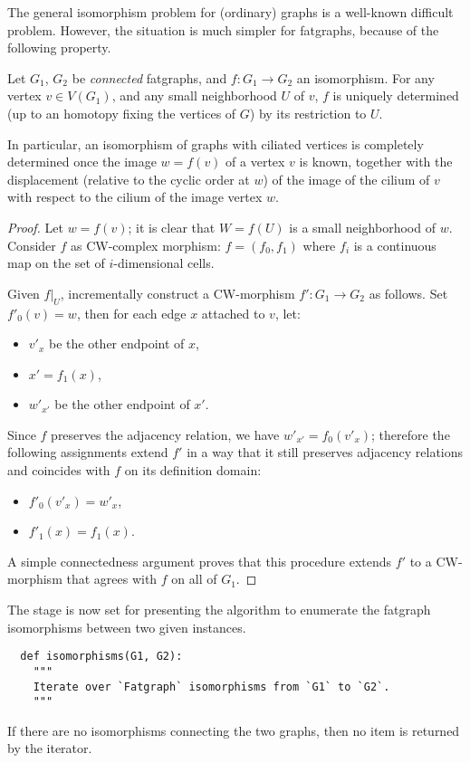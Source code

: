 The general isomorphism problem for (ordinary) graphs is a well-known
difficult problem. However, the situation is much simpler for
fatgraphs, because of the following property.
\begin{lemma}\label{lemma:rigidity}
  Let $G_1$, $G_2$ be \emph{connected} fatgraphs, and $f: G_1 \to G_2$
  an isomorphism.  For any vertex $v \in V(G_1)$, and any small
  neighborhood $U$ of $v$, $f$ is uniquely determined (up to an
  homotopy fixing the vertices of $G$) by its restriction to $U$.
\end{lemma}
In particular, an isomorphism of graphs with ciliated vertices is
completely determined once the image $w=f(v)$ of a vertex $v$ is
known, together with the displacement (relative to the cyclic order at
$w$) of the image of the cilium of $v$ with respect to the cilium of
the image vertex $w$.
\begin{proof}
  Let $w = f(v)$; it is clear that $W = f(U)$ is a small neighborhood
  of $w$.  Consider $f$ as CW-complex morphism: $f = (f_0, f_1)$ where
  $f_i$ is a continuous map on the set of $i$-dimensional cells.

  Given $f|_U$, incrementally construct a CW-morphism $f': G_1 \to
  G_2$ as follows. Set $f'_0(v) = w$, then for each edge $x$ attached
  to $v$, let:
  \begin{itemize}
  \item $v'_x$ be the other endpoint of $x$,
  \item $x' = f_1(x)$,
  \item $w'_{x'}$ be the other endpoint of $x'$.
  \end{itemize}
  Since $f$ preserves the adjacency relation, we have $w'_{x'} =
  f_0(v'_x)$; therefore the following assignments extend $f'$ in a way
  that it still preserves adjacency relations and coincides with $f$
  on its definition domain:
  \begin{itemize}
  \item $f'_0(v'_x) = w'_x$,
  \item $f'_1(x) = f_1(x)$.
  \end{itemize}

  A simple connectedness argument proves that this procedure extends
  $f'$ to a CW-morphism that agrees with $f$ on all of $G_1$.
\end{proof}

The stage is now set for presenting the algorithm to enumerate the
fatgraph isomorphisms between two given instances.
\begin{lstlisting}
  def isomorphisms(G1, G2):
    """
    Iterate over `Fatgraph` isomorphisms from `G1` to `G2`.
    """
\end{lstlisting}
If there are no isomorphisms connecting the two graphs, then no
item is returned by the iterator.

